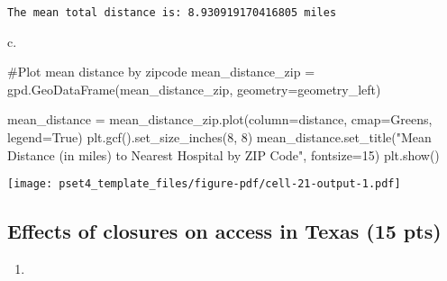 \documentclass[
  letterpaper,
  DIV=11,
  numbers=noendperiod]{scrartcl}
\newenvironment{Shaded}{\begin{snugshade}}{\end{snugshade}}
\newcommand{\CommentTok}[1]{\textcolor[rgb]{0.37,0.37,0.37}{#1}}
\newcommand{\DecValTok}[1]{\textcolor[rgb]{0.68,0.00,0.00}{#1}}
\newcommand{\NormalTok}[1]{\textcolor[rgb]{0.00,0.23,0.31}{#1}}
\newcommand{\OperatorTok}[1]{\textcolor[rgb]{0.37,0.37,0.37}{#1}}
\newcommand{\StringTok}[1]{\textcolor[rgb]{0.13,0.47,0.30}{#1}}
\newcommand{\VariableTok}[1]{\textcolor[rgb]{0.07,0.07,0.07}{#1}}
\providecommand{\tightlist}{%
  \setlength{\itemsep}{0pt}\setlength{\parskip}{0pt}}\usepackage{longtable,booktabs,array}
\begin{document}
\begin{verbatim}
The mean total distance is: 8.930919170416805 miles
\end{verbatim}

\hfill\break
c.

\begin{Shaded}
\begin{Highlighting}[]
\CommentTok{\#Plot mean distance by zipcode}
\NormalTok{mean\_distance\_zip }\OperatorTok{=}\NormalTok{ gpd.GeoDataFrame(mean\_distance\_zip, geometry}\OperatorTok{=}\StringTok{\textquotesingle{}geometry\_left\textquotesingle{}}\NormalTok{)}

\NormalTok{mean\_distance }\OperatorTok{=}\NormalTok{ mean\_distance\_zip.plot(column}\OperatorTok{=}\StringTok{\textquotesingle{}distance\textquotesingle{}}\NormalTok{, cmap}\OperatorTok{=}\StringTok{\textquotesingle{}Greens\textquotesingle{}}\NormalTok{, legend}\OperatorTok{=}\VariableTok{True}\NormalTok{)}
\NormalTok{plt.gcf().set\_size\_inches(}\DecValTok{8}\NormalTok{, }\DecValTok{8}\NormalTok{)}
\NormalTok{mean\_distance.set\_title(}\StringTok{"Mean Distance (in miles) to Nearest Hospital by ZIP Code"}\NormalTok{, fontsize}\OperatorTok{=}\DecValTok{15}\NormalTok{)}
\NormalTok{plt.show()}
\end{Highlighting}
\end{Shaded}

\texttt{[image: pset4\_template\_files/figure-pdf/cell-21-output-1.pdf]}

\subsection{Effects of closures on access in Texas (15
pts)}\label{effects-of-closures-on-access-in-texas-15-pts}

\begin{enumerate}
\def\labelenumi{\arabic{enumi}.}
\tightlist
\item
\end{enumerate}
\end{document}
